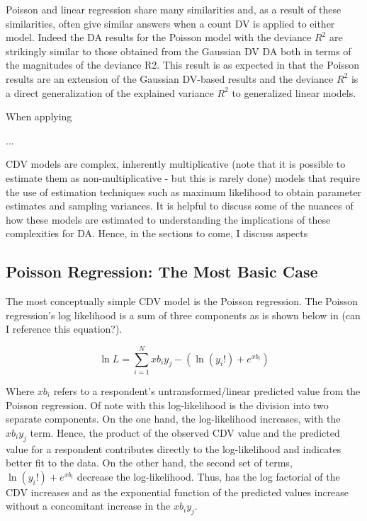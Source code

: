 \documentclass[ShortAfour,times,sageapa]{sagej}
\begin{document}
	
	Poisson and linear regression share many similarities and, as a result of these similarities, often give similar answers when a count DV is applied to either model.
	Indeed the DA results for the Poisson model with the deviance $R^2$ are strikingly similar to those obtained from the Gaussian DV DA both in terms of the magnitudes of the deviance R2.  
	This result is as expected in that the Poisson results are an extension of the Gaussian DV-based results and the deviance $R^2$ is a direct generalization of the explained variance $R^2$ to generalized linear models.
	
	When applying
	
	...
	
	
	CDV models are complex, inherently multiplicative (note that it is possible to estimate them as non-multiplicative - but this is rarely done) models that require the use of estimation techniques such as maximum likelihood to obtain parameter estimates and sampling variances.
	It is helpful to discuss some of the nuances of how these models are estimated to understanding the implications of these complexities for DA.
	Hence, in the sections to come, I discuss aspects 

	\subsection{Poisson Regression: The Most Basic Case}
	
	The most conceptually simple CDV model is the Poisson regression.  
	The Poisson regression's log likelihood is a sum of three components as is shown below in (can I reference this equation?).
	
	\begin{equation}
		\ln L = \sum_{i=1}^{N} xb_{i}y_{j} - (\ln (y_{i}!) + e^{xb_{i}})
	\end{equation}

	Where $xb_{i}$ refers to a respondent's untransformed/linear predicted value from the Poisson regression.  
	Of note with this log-likelihood is the division into two separate components.  
	On the one hand, the log-likelihood increases, with the $xb_{i}y_{j}$ term.  
	Hence, the product of the observed CDV value and the predicted value for a respondent contributes directly to the log-likelihood and indicates better fit to the data.
	On the other hand, the second set of terms, $\ln (y_{i}!) + e^{xb_{i}}$ decrease the log-likelihood.  
	Thus, has the log factorial of the CDV increases and as the exponential function of the predicted values increase without a concomitant increase in the $xb_{i}y_{j}$.
	
\end{document}
